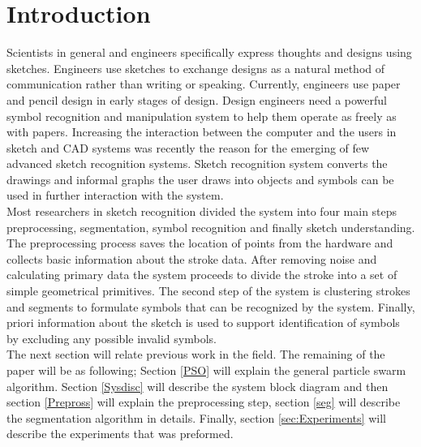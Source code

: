 \documentclass[a4paper,10pt]{IEEEconf}
\begin{document}
\section{Introduction}
Scientists in general and engineers specifically express thoughts and designs using sketches. Engineers use sketches to exchange designs as a natural method of communication rather than writing or speaking. Currently, engineers use paper and pencil design in early stages of design. Design engineers need a powerful symbol recognition and manipulation system to help them operate as freely as with papers. Increasing the interaction between the computer and the users in sketch and CAD systems was recently the reason for the emerging of few advanced sketch recognition systems. Sketch recognition system converts the drawings and informal graphs the user draws into objects and symbols can be used in further interaction with the system. \\
Most researchers in sketch recognition divided the system into four main steps preprocessing, segmentation, symbol recognition and finally sketch understanding. The preprocessing process saves the location of points from the hardware and collects basic information about the stroke data. After removing noise and calculating primary data the system proceeds to divide the stroke into a set of simple geometrical primitives.  The second step of the system is clustering strokes and segments to formulate symbols that can be recognized by the system. Finally, priori information about the sketch is used to support identification of symbols by excluding any possible invalid symbols. \\
The next section will relate previous work in the field. The remaining of the paper will be as following; Section \ref{PSO} will explain the general particle swarm algorithm. Section \ref{Sysdisc} will describe the system block diagram and then section \ref{Prepross} will explain the preprocessing step, section \ref{seg} will describe the segmentation algorithm in details. Finally, section \ref{sec:Experiments} will describe the experiments that was preformed.\\
\end{document}
